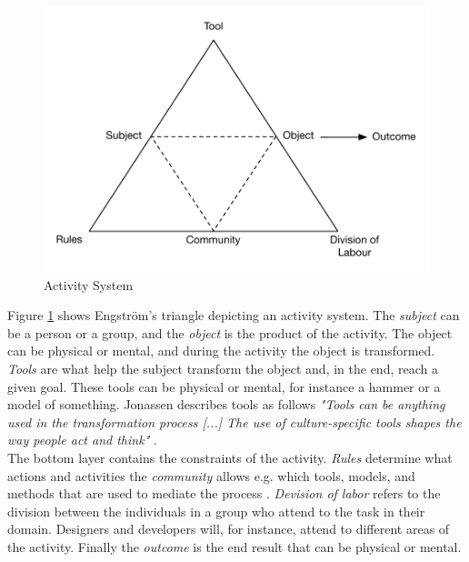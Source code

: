 \begin{figure}
    \centering
    \includegraphics[scale=0.6]{figures/activity_theory}
    \caption{Activity System}
    \label{fig:activity_theory}
\end{figure}


\noindent
Figure \ref{fig:activity_theory} shows Engström's triangle depicting an activity system. The \textit{subject} can be a person or a group, and the \textit{object} is the product of the activity. The object can be physical or mental, and during the activity the object is transformed. \textit{Tools} are what help the subject transform the object and, in the end, reach a given goal. These tools can be physical or mental, for instance a hammer or a model of something. Jonassen describes tools as follows \textit{"Tools can be anything used in the transformation process [...] The use of culture-specific tools shapes the way people act and think"} \cite[p. 63]{jonassen1999activitytheory}. \\

\noindent
The bottom layer contains the constraints of the activity. \textit{Rules} determine what actions and activities the \textit{community} allows e.g. which tools, models, and methods that are used to mediate the process \cite[p. 64]{jonassen1999activitytheory}. \textit{Devision of labor} refers to the division between the individuals in a group who attend to the task in their domain. Designers and developers will, for instance, attend to different areas of the activity. Finally the \textit{outcome} is the end result that can be physical or mental. \\

